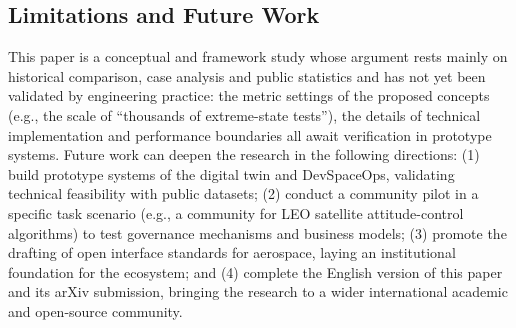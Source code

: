 \documentclass[11pt]{article}
\begin{document}
\subsection{Limitations and Future Work}
This paper is a conceptual and framework study whose argument rests mainly on historical comparison, case analysis and public statistics and has not yet been validated by engineering practice: the metric settings of the proposed concepts (e.g., the scale of ``thousands of extreme-state tests''), the details of technical implementation and performance boundaries all await verification in prototype systems. Future work can deepen the research in the following directions: (1) build prototype systems of the digital twin and DevSpaceOps, validating technical feasibility with public datasets; (2) conduct a community pilot in a specific task scenario (e.g., a community for LEO satellite attitude-control algorithms) to test governance mechanisms and business models; (3) promote the drafting of open interface standards for aerospace, laying an institutional foundation for the ecosystem; and (4) complete the English version of this paper and its arXiv submission, bringing the research to a wider international academic and open-source community.
\end{document}
